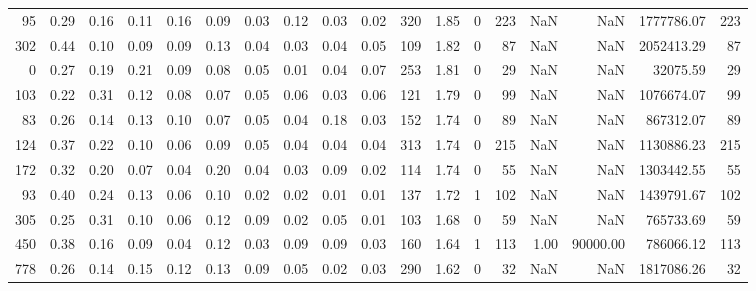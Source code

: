 \begin{tabular}{rrrrrrrrrrllrrrrrr}
           95 & 0.29 & 0.16 & 0.11 & 0.16 & 0.09 & 0.03 & 0.12 & 0.03 & 0.02 & 320 &  1.85 &                  0 &       223 &             NaN &                 NaN &    1777786.07 &                   223 \\
          302 & 0.44 & 0.10 & 0.09 & 0.09 & 0.13 & 0.04 & 0.03 & 0.04 & 0.05 & 109 &  1.82 &                  0 &        87 &             NaN &                 NaN &    2052413.29 &                    87 \\
            0 & 0.27 & 0.19 & 0.21 & 0.09 & 0.08 & 0.05 & 0.01 & 0.04 & 0.07 & 253 &  1.81 &                  0 &        29 &             NaN &                 NaN &      32075.59 &                    29 \\
          103 & 0.22 & 0.31 & 0.12 & 0.08 & 0.07 & 0.05 & 0.06 & 0.03 & 0.06 & 121 &  1.79 &                  0 &        99 &             NaN &                 NaN &    1076674.07 &                    99 \\
           83 & 0.26 & 0.14 & 0.13 & 0.10 & 0.07 & 0.05 & 0.04 & 0.18 & 0.03 & 152 &  1.74 &                  0 &        89 &             NaN &                 NaN &     867312.07 &                    89 \\
          124 & 0.37 & 0.22 & 0.10 & 0.06 & 0.09 & 0.05 & 0.04 & 0.04 & 0.04 & 313 &  1.74 &                  0 &       215 &             NaN &                 NaN &    1130886.23 &                   215 \\
          172 & 0.32 & 0.20 & 0.07 & 0.04 & 0.20 & 0.04 & 0.03 & 0.09 & 0.02 & 114 &  1.74 &                  0 &        55 &             NaN &                 NaN &    1303442.55 &                    55 \\
           93 & 0.40 & 0.24 & 0.13 & 0.06 & 0.10 & 0.02 & 0.02 & 0.01 & 0.01 & 137 &  1.72 &                  1 &       102 &             NaN &                 NaN &    1439791.67 &                   102 \\
          305 & 0.25 & 0.31 & 0.10 & 0.06 & 0.12 & 0.09 & 0.02 & 0.05 & 0.01 & 103 &  1.68 &                  0 &        59 &             NaN &                 NaN &     765733.69 &                    59 \\
          450 & 0.38 & 0.16 & 0.09 & 0.04 & 0.12 & 0.03 & 0.09 & 0.09 & 0.03 & 160 &  1.64 &                  1 &       113 &            1.00 &            90000.00 &     786066.12 &                   113 \\
          778 & 0.26 & 0.14 & 0.15 & 0.12 & 0.13 & 0.09 & 0.05 & 0.02 & 0.03 & 290 &  1.62 &                  0 &        32 &             NaN &                 NaN &    1817086.26 &                    32 \\

\end{tabular}
